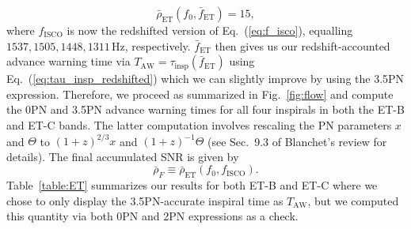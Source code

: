 \documentclass[amsmath,amssymb,aps,floats,amsfonts,notitlepage,superscriptaddress,eqsecnum,nofootinbib,10pt]{revtex4-1}
\newcommand{\be}{\begin{equation}}
\newcommand{\ee}{\end{equation}}
\begin{document}
%
\be
\bar\rho_\text{ET}(f_0,\bar{f}_\text{ET}) = 15 \label{eq:ET_fbar},
\ee
%
where $f_\text{ISCO}$ is now the redshifted version of Eq.~(\ref{eq:f_isco}), equalling $1537, 1505, 1448, 1311\,$Hz, respectively.
$\bar{f}_\text{ET}$ then gives us our redshift-accounted advance warning time via $T_\text{AW}=\tau_\text{insp}(\bar{f}_\text{ET})$ using Eq.~(\ref{eq:tau_insp_redshifted}) which we can slightly improve by using the 3.5PN expression. 
Therefore, we proceed as summarized in Fig.~\ref{fig:flow} and compute the 0PN and 3.5PN advance warning times 
for all four inspirals in both the ET-B and ET-C bands.
The latter computation involves rescaling the PN parameters $x$ and $\Theta$ to $(1+z)^{2/3} x$ and $(1+z)^{-1}\Theta $ (see Sec.~9.3 of 
Blanchet's review \cite{Blanchet_LRR} for details).
The final accumulated SNR is given by
%
\be
\bar\rho_{F}\equiv \bar\rho_\text{ET}(f_0,f_\text{ISCO})  .\label{eq:rhoF_ET}
\ee
%
Table~\ref{table:ET} summarizes our results for both ET-B and ET-C where we chose to only display the 3.5PN-accurate inspiral time as $T_\text{AW}$,
but we computed this quantity via both 0PN and 2PN expressions as a check.
\end{document}

